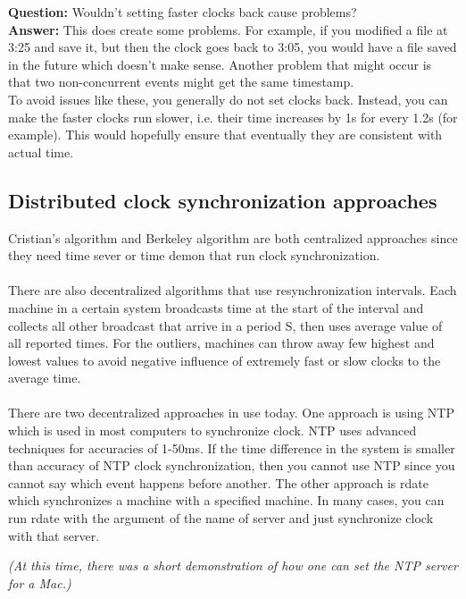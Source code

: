 \documentclass[twoside]{article}
\begin{document}
\textbf{Question:} Wouldn't setting faster clocks back cause problems?\\
\textbf{Answer:} This does create some problems. For example, if you modified a file at 3:25 and save it, but then the clock goes back to 3:05, you would have a file saved in the future which doesn't make sense. Another problem that might occur is that two non-concurrent events might get the same timestamp.\\

To avoid issues like these, you generally do not set clocks back. Instead, you can make the faster clocks run slower, i.e. their time increases by 1s for every 1.2s (for example). This would hopefully ensure that eventually they are consistent with actual time.

\subsection{Distributed clock synchronization approaches}
Cristian’s algorithm and Berkeley algorithm are both centralized approaches since they need time sever or time demon that run clock synchronization.\\\\
There are also decentralized algorithms that use resynchronization intervals. Each machine in a certain system broadcasts time at the start of the interval and collects all other broadcast that arrive in a period S, then uses average value of all reported times. For the outliers, machines can throw away few highest and lowest values to avoid negative influence of extremely fast or slow clocks to the average time. \\\\
There are two decentralized approaches in use today. One approach is using NTP which is used in most computers to synchronize clock. NTP uses advanced techniques for accuracies of 1-50ms. If the time difference in the system is smaller than accuracy of NTP clock synchronization, then you cannot use NTP since you cannot say which event happens before another. The other approach is rdate which synchronizes a machine with a specified machine. In many cases, you can run rdate with the argument of the name of server and just synchronize clock with that server. 

\textit{(At this time, there was a short demonstration of how one can set the NTP server for a Mac.)}
\end{document}
